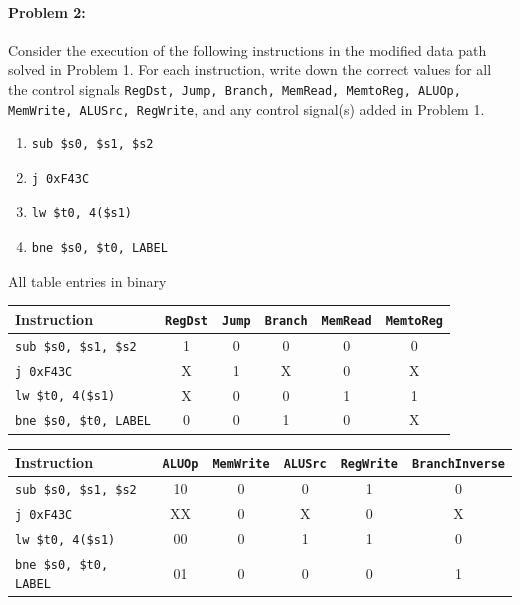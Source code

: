 \documentclass[12pt,letterpaper,titlepage]{article}
\begin{document}
\begin{raggedright}
\clearpage
\paragraph{Problem 2: }
Consider the execution of the following instructions in the modified
data path solved in Problem 1. For each instruction, write down the correct values for all the control signals \texttt{RegDst, Jump, Branch, MemRead, MemtoReg, ALUOp, MemWrite, ALUSrc, RegWrite}, and any control signal(s) added in Problem 1.

\begin{enumerate}
\item 
\begin{lstlisting}
sub $s0, $s1, $s2
\end{lstlisting}

\item 
\begin{lstlisting}
j 0xF43C
\end{lstlisting}

\item 
\begin{lstlisting}
lw $t0, 4($s1)
\end{lstlisting}

\item 
\begin{lstlisting}
bne $s0, $t0, LABEL
\end{lstlisting}
\end{enumerate}

All table entries in binary

\begin{tabular}{|l|c|c|c|c|c|}
  \hline Instruction      & \texttt{RegDst}   & \texttt{Jump}  & \texttt{Branch} 
       & \texttt{MemRead} & \texttt{MemtoReg}
\\\hline \texttt{sub \$s0, \$s1, \$s2}  & 1 & 0 & 0 & 0 & 0
\\\hline \texttt{j 0xF43C}              & X & 1 & X & 0 & X
\\\hline \texttt{lw \$t0, 4(\$s1)}      & X & 0 & 0 & 1 & 1
\\\hline \texttt{bne \$s0, \$t0, LABEL} & 0 & 0 & 1 & 0 & X
\\\hline
\end{tabular}

\begin{tabular}{|l|c|c|c|c|c|}
  \hline Instruction       & \texttt{ALUOp} & \texttt{MemWrite} & \texttt{ALUSrc}  
       & \texttt{RegWrite} & \texttt{BranchInverse}
\\\hline \texttt{sub \$s0, \$s1, \$s2}  & 10 & 0 & 0 & 1 & 0
\\\hline \texttt{j 0xF43C}              & XX & 0 & X & 0 & X
\\\hline \texttt{lw \$t0, 4(\$s1)}      & 00 & 0 & 1 & 1 & 0
\\\hline \texttt{bne \$s0, \$t0, LABEL} & 01 & 0 & 0 & 0 & 1
\\\hline
\end{tabular}
\clearpage


\end{raggedright}
\end{document}
